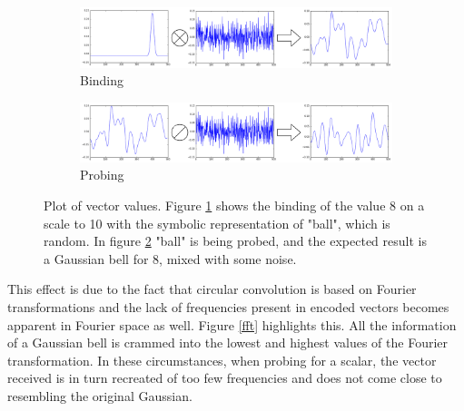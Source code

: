 \documentclass[conference]{IEEEtran}
\begin{document}
	
	\begin{figure}
		\begin{subfigure}{1\columnwidth}
			\includegraphics[width=\columnwidth]{img/scalar-pre-perm.png}
			\caption{Binding}
			\label{no-perm-a}
		\end{subfigure}
		\begin{subfigure}{1\columnwidth}
			\includegraphics[width=\columnwidth]{img/scalar-pre-perm-probe.png}
			\caption{Probing}
			\label{no-perm-b}
		\end{subfigure}
		\caption{Plot of vector values.
Figure \ref{no-perm-a} shows the binding of the value 8 on a scale to 10 with the symbolic representation of "ball", which is random.
In figure \ref{no-perm-b} "ball" is being probed, and the expected result is a Gaussian bell for 8, mixed with some noise.}
		\label{no-perm}
	\end{figure}
	
	This effect is due to the fact that circular convolution is based on Fourier transformations and the lack of frequencies present in encoded vectors becomes apparent in Fourier space as well.
Figure \ref{fft} highlights this.
All the information of a Gaussian bell is crammed into the lowest and highest values of the Fourier transformation.
In these circumstances, when probing for a scalar, the vector received is in turn recreated of too few frequencies and does not come close to resembling the original Gaussian.
\end{document}
